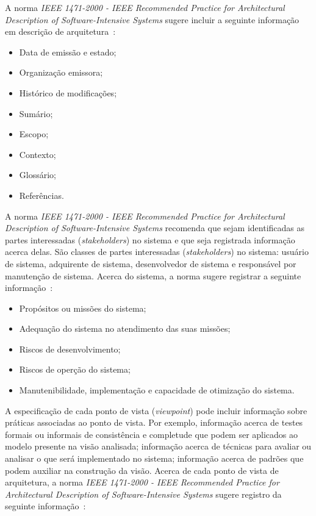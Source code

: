 A norma \emph{IEEE 1471-2000 - IEEE Recommended Practice for Architectural Description of Software-Intensive Systems} sugere incluir a seguinte informação em descrição de arquitetura~\cite{ISO_1471}: 

\begin{itemize}
    \item Data de emissão e estado;
    \item Organização emissora;
    \item Histórico de modificações;
    \item Sumário;
    \item Escopo;
    \item Contexto;
    \item Glossário;
    \item Referências.

\end{itemize}

A norma \emph{IEEE 1471-2000 - IEEE Recommended Practice for Architectural Description of Software-Intensive Systems} recomenda que sejam identificadas as partes interessadas (\emph{stakeholders}) no sistema e que seja registrada informação acerca delas. São classes de partes interessadas (\emph{stakeholders}) no sistema: usuário de sistema, adquirente de sistema, desenvolvedor de sistema e responsável por manutenção de sistema. Acerca do sistema, a norma sugere registrar a seguinte informação~\cite{ISO_1471}: 

\begin{itemize}
    \item Propósitos ou missões do sistema;
    \item Adequação do sistema no atendimento das suas missões;
    \item  Riscos de desenvolvimento;
    \item  Riscos de operção do sistema;
    \item Manutenibilidade, implementação e capacidade de otimização do sistema.

\end{itemize}

A especificação de cada ponto de vista (\emph{viewpoint}) pode incluir informação sobre práticas associadas ao ponto de vista. Por exemplo, informação acerca de testes formais ou informais de consistência e completude que podem ser aplicados ao modelo presente na visão analisada; informação acerca de técnicas para avaliar ou analisar o que será implementado no sistema; informação acerca de padrões que podem auxiliar na construção da visão. Acerca de cada ponto de vista de arquitetura, a norma \emph{IEEE 1471-2000 - IEEE Recommended Practice for Architectural Description of Software-Intensive Systems} sugere registro da seguinte informação~\cite{ISO_1471}:

